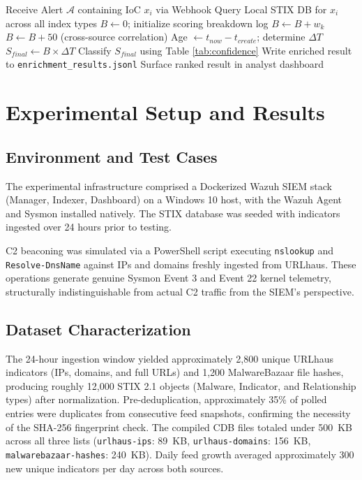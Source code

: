 \documentclass[conference]{IEEEtran}
\begin{document}
\begin{algorithm}
\caption{SOAR Enrichment \& Temporal Decay Evaluation}\label{alg:enrichment}
\begin{algorithmic}[1]
\STATE Receive Alert $\mathcal{A}$ containing IoC $x_i$ via Webhook
\STATE Query Local STIX DB for $x_i$ across all index types
    \STATE $B \leftarrow 0$; initialize scoring breakdown log
        \STATE $B \leftarrow B + w_k$
    \ENDFOR
        \STATE $B \leftarrow B + 50$ (cross-source correlation)
    \ENDIF
    \STATE Age $\leftarrow t_{now} - t_{create}$; determine $\Delta T$
    \STATE $S_{final} \leftarrow B \times \Delta T$
    \STATE Classify $S_{final}$ using Table \ref{tab:confidence}
    \STATE Write enriched result to \texttt{enrichment\_results.jsonl}
    \STATE Surface ranked result in analyst dashboard
\ENDIF
\end{algorithmic}
\end{algorithm}

\section{Experimental Setup and Results}

\subsection{Environment and Test Cases}
The experimental infrastructure comprised a Dockerized Wazuh SIEM stack (Manager, Indexer, Dashboard) on a Windows 10 host, with the Wazuh Agent and Sysmon installed natively. The STIX database was seeded with indicators ingested over 24 hours prior to testing.

C2 beaconing was simulated via a PowerShell script executing \texttt{nslookup} and \texttt{Resolve-DnsName} against IPs and domains freshly ingested from URLhaus. These operations generate genuine Sysmon Event 3 and Event 22 kernel telemetry, structurally indistinguishable from actual C2 traffic from the SIEM's perspective.

\subsection{Dataset Characterization}
The 24-hour ingestion window yielded approximately 2,800 unique URLhaus indicators (IPs, domains, and full URLs) and 1,200 MalwareBazaar file hashes, producing roughly 12,000 STIX 2.1 objects (Malware, Indicator, and Relationship types) after normalization. Pre-deduplication, approximately 35\% of polled entries were duplicates from consecutive feed snapshots, confirming the necessity of the SHA-256 fingerprint check. The compiled CDB files totaled under 500~KB across all three lists (\texttt{urlhaus-ips}: 89~KB, \texttt{urlhaus-domains}: 156~KB, \texttt{malwarebazaar-hashes}: 240~KB). Daily feed growth averaged approximately 300 new unique indicators per day across both sources.
\end{document}
